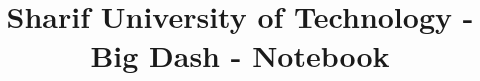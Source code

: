\documentclass[10pt]{article}
\title{\vspace{-4ex}\Large{Sharif University of Technology - Big Dash - Notebook}}
\author{}
\date{}
\begin{document}
\begin{landscape}
\begin{multicols}{2}

\maketitle
\vspace{-13ex}
{
\baselineskip
\tableofcontents
}
\pagestyle{fancy}



\end{multicols}
\end{landscape}
\end{document}
